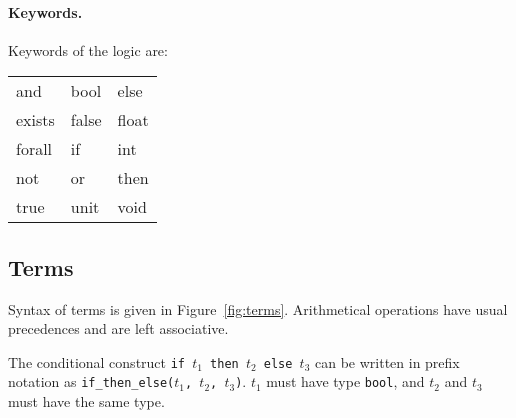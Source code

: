 \documentclass[a4paper,12pt]{report}
\begin{document}
\paragraph{Keywords.}

Keywords of the logic are:
\begin{center}
{\tt\begin{tabular}{l@{\qquad}l@{\qquad}l}
and & bool & else \\
exists & false & float \\
forall & if & int  \\
not & or & then  \\
true & unit & void
\end{tabular}}
\end{center}


\subsection{Terms}
\label{syntax:terms}

Syntax of terms is given in Figure~\ref{fig:terms}.
Arithmetical operations have usual precedences and are left associative.

The conditional construct \texttt{if $t_1$ then $t_2$ else $t_3$} can
be written in prefix notation as \texttt{if\_then\_else($t_1$, $t_2$,
  $t_3$)}. $t_1$ must have type \texttt{bool}, and $t_2$ and $t_3$ must
have the same type.
\end{document}
